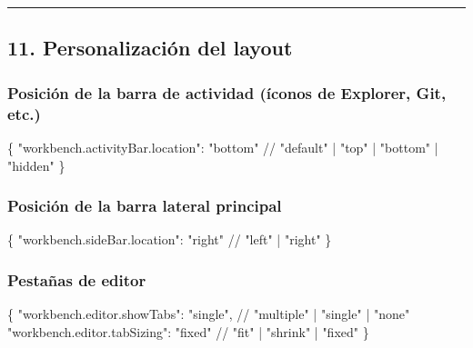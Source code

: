 \documentclass[
  doc,
  floatsintext,
  longtable,
  a4paper,
  nolmodern,
  notxfonts,
  notimes,
  12pt,
  colorlinks=true,linkcolor=blue,citecolor=blue,urlcolor=blue]{apa7}
\newenvironment{Shaded}{\begin{snugshade}}{\end{snugshade}}
\newcommand{\DataTypeTok}[1]{\textcolor[rgb]{0.68,0.00,0.00}{#1}}
\newcommand{\ErrorTok}[1]{\textcolor[rgb]{0.68,0.00,0.00}{#1}}
\newcommand{\FunctionTok}[1]{\textcolor[rgb]{0.28,0.35,0.67}{#1}}
\newcommand{\StringTok}[1]{\textcolor[rgb]{0.13,0.47,0.30}{#1}}
\newcounter{none} %
\begin{document}
\begin{center}\rule{0.5\linewidth}{0.5pt}\end{center}

\subsection{11. Personalización del
layout}\label{personalizaciuxf3n-del-layout}

\subsubsection{Posición de la barra de actividad (íconos de Explorer,
Git,
etc.)}\label{posiciuxf3n-de-la-barra-de-actividad-uxedconos-de-explorer-git-etc.}

\begin{Shaded}
\begin{Highlighting}[]
\FunctionTok{\{}
  \DataTypeTok{"workbench.activityBar.location"}\FunctionTok{:} \StringTok{"bottom"} \ErrorTok{//} \StringTok{"default"} \ErrorTok{|} \StringTok{"top"} \ErrorTok{|} \StringTok{"bottom"} \ErrorTok{|} \StringTok{"hidden"}
\FunctionTok{\}}
\end{Highlighting}
\end{Shaded}

\subsubsection{Posición de la barra lateral
principal}\label{posiciuxf3n-de-la-barra-lateral-principal}

\begin{Shaded}
\begin{Highlighting}[]
\FunctionTok{\{}
  \DataTypeTok{"workbench.sideBar.location"}\FunctionTok{:} \StringTok{"right"} \ErrorTok{//} \StringTok{"left"} \ErrorTok{|} \StringTok{"right"}
\FunctionTok{\}}
\end{Highlighting}
\end{Shaded}

\subsubsection{Pestañas de editor}\label{pestauxf1as-de-editor}

\begin{Shaded}
\begin{Highlighting}[]
\FunctionTok{\{}
  \DataTypeTok{"workbench.editor.showTabs"}\FunctionTok{:} \StringTok{"single"}\FunctionTok{,} \ErrorTok{//} \DataTypeTok{"multiple"} \ErrorTok{|} \DataTypeTok{"single"} \ErrorTok{|} \DataTypeTok{"none"}
  \DataTypeTok{"workbench.editor.tabSizing"}\FunctionTok{:} \StringTok{"fixed"} \ErrorTok{//} \StringTok{"fit"} \ErrorTok{|} \StringTok{"shrink"} \ErrorTok{|} \StringTok{"fixed"}
\FunctionTok{\}}
\end{Highlighting}
\end{Shaded}
\end{document}
